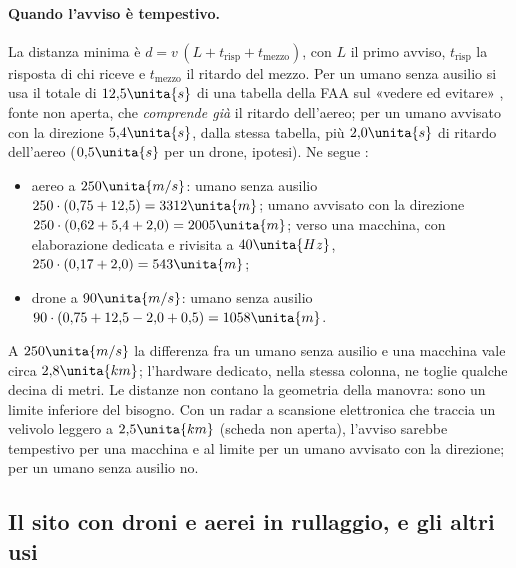 \paragraph{Quando l'avviso è tempestivo.} La distanza minima è $d=v\,(L+t_{\mathrm{risp}}+t_{\mathrm{mezzo}})$, con $L$ il primo avviso, $t_{\mathrm{risp}}$ la risposta di chi riceve e $t_{\mathrm{mezzo}}$ il ritardo del mezzo. Per un umano senza ausilio si usa il totale di $12{,}5\unita{s}$ di una tabella della FAA sul «vedere ed evitare» \citep{faa-ac-90-48d}, fonte non aperta, che \emph{comprende già} il ritardo dell'aereo; per un umano avvisato con la direzione $5{,}4\unita{s}$, dalla stessa tabella, più $2{,}0\unita{s}$ di ritardo dell'aereo ($0{,}5\unita{s}$ per un drone, ipotesi). Ne segue :
\begin{itemize}
\item aereo a $250\unita{m/s}$: umano senza ausilio $250\cdot(0{,}75+12{,}5)=3312\unita{m}$; umano avvisato con la direzione $250\cdot(0{,}62+5{,}4+2{,}0)=2005\unita{m}$; verso una macchina, con elaborazione dedicata e rivisita a $40\unita{Hz}$, $250\cdot(0{,}17+2{,}0)=543\unita{m}$;
\item drone a $90\unita{m/s}$: umano senza ausilio $90\cdot(0{,}75+12{,}5-2{,}0+0{,}5)=1058\unita{m}$.
\end{itemize}
A $250\unita{m/s}$ la differenza fra un umano senza ausilio e una macchina vale circa $2{,}8\unita{km}$; l'hardware dedicato, nella stessa colonna, ne toglie qualche decina di metri. Le distanze non contano la geometria della manovra: sono un limite inferiore del bisogno. Con un radar a scansione elettronica che traccia un velivolo leggero a $2{,}5\unita{km}$ (scheda non aperta), l'avviso sarebbe tempestivo per una macchina e al limite per un umano avvisato con la direzione; per un umano senza ausilio no.

\subsection{Il sito con droni e aerei in rullaggio, e gli altri usi}\label{sec:vo-altri}

